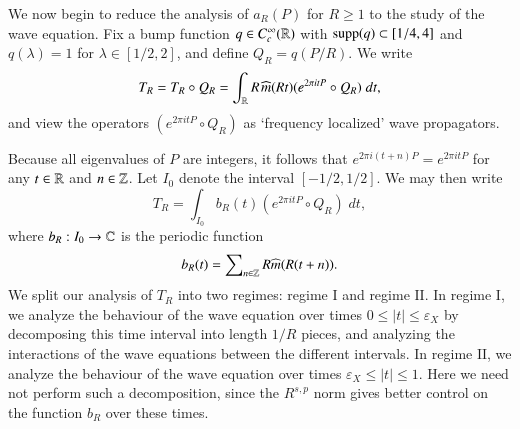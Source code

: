 We now begin to reduce the analysis of $a_R(P)$ for $R \geq 1$ to the study of the wave equation. Fix a bump function $q \in C_c^\infty(\operatorname{\mathbb{R}})$ with $\operatorname{\text{supp}}(q) \subset [1/4,4]$ and $q(\lambda) = 1$ for $\lambda \in [1/2,2]$, and define $Q_R = q(P/R)$. %
We write
%
\begin{equation}
    T_R = T_R \circ Q_R = \int_{\operatorname{\mathbb{R}}} R\;\! \widehat{m}(R t) (e^{2 \pi i t P} \circ Q_R)\; dt,
\end{equation}
%
and view the operators $(e^{2 \pi i t P} \circ Q_R)$ as `frequency localized' wave propagators.

Because all eigenvalues of $P$ are integers, it follows that $e^{2 \pi i (t + n) P} = e^{2 \pi i t P}$ for any $t \in \operatorname{\mathbb{R}}$ and $n \in \operatorname{\mathbb{Z}}$. Let $I_0$ denote the interval $[-1/2,1/2]$. We may then write
%
\begin{equation}
    T_R = \int_{I_0} b_R(t) (e^{2 \pi i tP} \circ Q_R)\; dt,
\end{equation}
%
where $b_R: I_0 \to \operatorname{\mathbb{C}}$ is the periodic function
%
\begin{equation}
    b_R(t) = \sum\nolimits_{n \in \operatorname{\mathbb{Z}}} R \widehat{m}(R (t + n)).
\end{equation}
We split our analysis of $T_R$ into two regimes: regime $\text{I}$ and regime $\text{II}$. In regime $\text{I}$, we analyze the behaviour of the wave equation over times $0 \leq |t| \leq \varepsilon_X$ by decomposing this time interval into length $1/R$ pieces, and analyzing the interactions of the wave equations between the different intervals. In regime $\text{II}$, we analyze the behaviour of the wave equation over times $\varepsilon_X \leq |t| \leq 1$. Here we need not perform such a decomposition, since the $R^{s,p}$ norm gives better control on the function $b_R$ over these times.

